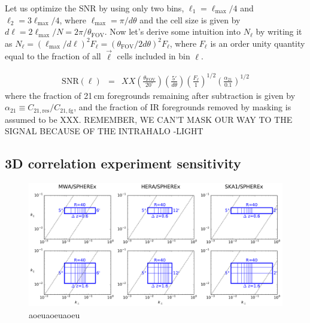 \documentclass[preprint]{aastex}
\newcommand{\IR}{\text{IR}}
\newcommand{\cosmo}{\text{cosmo}}
\newcommand{\fg}{\text{fg}}
\newcommand{\res}{\text{res}}
\newcommand{\SNR}{\text{SNR}}
\begin{document}
Let us optimize the SNR by using only two bins, $\ell_1=\ell_\text{max}/4$ and $\ell_2=3\ell_\text{max}/4$, where $\ell_\text{max}=\pi/d\theta$ and the cell size is given by $d\ell=2\ell_\text{max}/N=2\pi/\theta_\text{FOV}$. Now let's derive some intuition into $N_\ell$ by writing it as $N_\ell=(\ell_\text{max}/d\ell)^2F_\ell=(\theta_\text{FOV}/2d\theta)^2F_\ell$, where $F_\ell$ is an order unity quantity equal to the fraction of all $\vec{\ell}$ cells included in bin $\ell$.


\begin{eqnarray}
	\SNR(\ell)&=&XX \left(\frac{\theta_\text{FOV}}{20^\circ}\right)\left(\frac{5'}{d\theta}\right)\left(\frac{F_\ell}{1}\right)^{1/2}\left(\frac{\alpha_{21}}{0.1}\right)^{1/2}
\end{eqnarray}
where the fraction of 21\,cm foregrounds remaining after subtraction is given by $\alpha_{21}\equiv C_{21,\res}/C_{21,\fg}$, and the fraction of IR foregrounds removed by masking is assumed to be XXX. REMEMBER, WE CAN'T MASK OUR WAY TO THE SIGNAL BECAUSE OF THE INTRAHALO
-LIGHT


\subsection{3D correlation experiment sensitivity}

\begin{figure}[h]
\centering
\includegraphics[width=6.5in]{images/kspace_overlap.pdf}
\caption{aoeuaoeuaoeu}
\label{fig:corgrid}
\end{figure}
\end{document}

